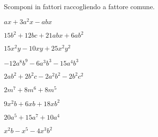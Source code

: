 \subsubsection*{}

\begin{esercizio}[*]
\label{ese:div.009}
Scomponi in fattori raccogliendo a fattore comune.
\begin{enumeratea}
\item \(ax+3a^{2}x-abx\) 
\item \(15b^{2}+12bc+21abx+6ab^{2}\) 
\item \(15x^{2}y-10xy+25x^{2}y^{2}\) 
\item \(-12a^{8}b^{9}-6a^{3}b^{3}-15a^{4}b^{3}\) 
\item \(2ab^{2}+2b^{2}c-2a^{2}b^{2}-2b^{2}c^{2}\) 
\item \(2m^{7}+8m^{6}+8m^{5}\) 
\item \(9x^{2}b+6xb+18xb^{2}\) 
\item \(20a^{5}+15a^{7}+10a^{4}\) 
\item \(x^{2}b-x^{5}-4x^{3}b^{2}\) 
\end{enumeratea}
\end{esercizio}


